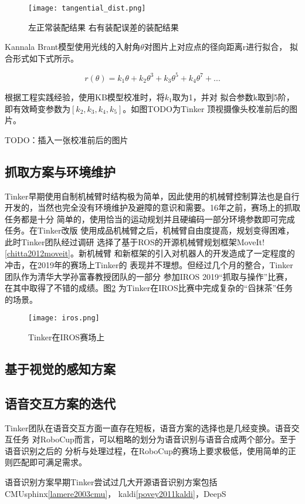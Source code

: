 \begin{figure}[h] %
  \centering
  \texttt{[image: tangential\_dist.png]}
  \caption{左正常装配结果 右有装配误差的装配结果}
  \label{fig:tangential_distort}
\end{figure}

Kannala Brant模型使用光线的入射角$\theta$对图片上对应点的径向距离r进行拟合，
拟合形式如下式所示。

\begin{equation}
  r(\theta) = k_1\theta + k_2\theta^{3} + k_3\theta^{5} + k_4\theta^{7} + ...
\end{equation}

根据工程实践经验，使用KB模型校准时，将$k_1$取为1，并对
拟合参数{k}取到5阶，即有效畸变参数为$[k_2, k_3, k_4, k_5]$。如图TODO为Tinker
顶视摄像头校准前后的图片。

TODO：插入一张校准前后的图片



\subsection{抓取方案与环境维护}

Tinker早期使用自制机械臂时结构极为简单，因此使用的机械臂控制算法也是自行
开发的，当然也完全没有环境维护及避障的意识和需要。16年之前，赛场上的抓取任务都是十分
简单的，使用恰当的运动规划并且硬编码一部分环境参数即可完成任务。在Tinker改版
使用成品机械臂之后，机械臂自由度提高，规划变得困难，此时Tinker团队经过调研
选择了基于ROS的开源机械臂规划框架MoveIt!\ref{chitta2012moveit}。新机械臂
和新框架的引入对机器人的开发造成了一定程度的冲击，在2019年的赛场上Tinker的
表现并不理想。但经过几个月的整合，Tinker团队作为清华大学孙富春教授团队的一部分
参加IROS 2019“抓取与操作”比赛，在其中取得了不错的成绩。图\ref{fig:iros}
为Tinker在IROS比赛中完成复杂的“舀抹茶”任务的场景。

\begin{figure}
  \centering
  \texttt{[image: iros.png]}
  \caption{Tinker在IROS赛场上}
  \label{fig:iros}
\end{figure}


\subsection{基于视觉的感知方案}

\subsection{语音交互方案的迭代}

Tinker团队在语音交互方面一直存在短板，语音方案的选择也是几经变换。语音交互任务
对RoboCup而言，可以粗略的划分为语音识别与语音合成两个部分。至于语音识别之后的
分析与处理过程，在RoboCup的赛场上要求极低，使用简单的正则匹配即可满足需求。

语音识别方案早期Tinker尝试过几大开源语音识别方案包括CMUsphinx\ref{lamere2003cmu}，
kaldi\ref{povey2011kaldi}，DeepS




























